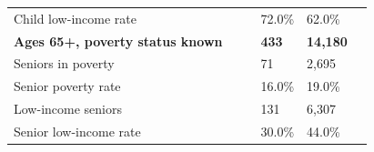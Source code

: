 \documentclass[9pt]{report}
\begin{document}
\begin{tabular}{p{.10in}p{.10in}p{.10in}p{3.7in}>{\hfill}p{.85in}>{\hfill}p{.85in}>{\hfill}p{.85in}>{\hfill}p{.85in}p{0.1in}}
\multicolumn{4}{l}{\parbox{3.6in}{\strut\raggedright{{Child low-income rate}}\strut}} &  &  & 72.0\% & 62.0\% & \multicolumn{1}{l}{}  \\ 
\multicolumn{4}{l}{\parbox{3.5in}{\strut\raggedright{\textbf{Ages 65+, poverty status known}\strut}}} & \textbf{} & \textbf{} & \textbf{433} & \textbf{14,180} & \textbf{} \\ 
\multicolumn{4}{l}{\parbox{3.6in}{\strut\raggedright{{Seniors in poverty}}\strut}} &  &  & 71 & 2,695 & \multicolumn{1}{l}{}  \\ 
\multicolumn{4}{l}{\parbox{3.6in}{\strut\raggedright{{Senior poverty rate}}\strut}} &  &  & 16.0\% & 19.0\% & \multicolumn{1}{l}{}  \\ 
\multicolumn{4}{l}{\parbox{3.6in}{\strut\raggedright{{Low-income seniors}}\strut}} &  &  & 131 & 6,307 & \multicolumn{1}{l}{}  \\ 
\multicolumn{4}{l}{\parbox{3.6in}{\strut\raggedright{{Senior low-income rate}}\strut}} &  &  & 30.0\% & 44.0\% & \multicolumn{1}{l}{}  \\ 

\end{tabular}
\setlength{\tabcolsep}{6pt} %
\end{document}

